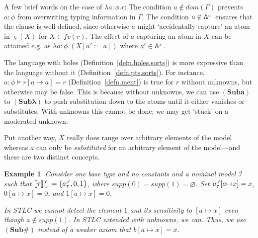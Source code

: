 \documentclass[submission,copyright]{eptcs}
\newtheorem{xmpl}[thrm]{Example}
\newcommand{\f}[1]{\ensuremath{\text{$\mathit{#1}$}}}
\newcommand{\lam}[1]{\lambda{#1}.}
\newcommand{\rulefont}[1]{\ensuremath{(\mathbf{#1})}}
\newcommand{\sm}{\mapsto}
\newcommand{\ssm}{:=}
\newcommand{\dom}{\f{dom}}
\newcommand{\supp}{\f{supp}}
\newcommand{\fv}{\f{fv}}
\newcommand\den[1]{{\hspace{.00ex}\scalebox{.55}{$#1$}}}
\newcommand{\idenot}[2]{\denot{\interp I}{#1}{#2}}
\newcommand\interp[1]{\ensuremath{\mathscr #1}}
\newcommand{\denot}[3]{\llbracket #3 \rrbracket_{\scalebox{.6}{$#2$}}^\den{#1}} \newcommand{\hdenot}[1]{\denot{\interp H}{}{#1}}
\newcommand\ment{\vDash}
\newcommand\atomsdown{\mathbb A^{\hspace{-.3ex}{}_{{}^<}}}
\begin{document}
\noindent A few brief words on the case of $\lam{a{:}\phi}r$:
The condition $a\not\in\dom(\Gamma)$ prevents $a{:}\phi$ from overwriting typing information in $\Gamma$.
The condition $a\not\in\atomsdown$ ensures that the clause is well-defined, since otherwise $a$ might `accidentally capture' an atom in $\varsigma(X)$ for $X\in\fv(r)$.
The effect of $a$ capturing an atom in $X$ can be attained e.g. as $\lam{a{:}\phi}(X[a'{\ssm} a])$ where $a'\in\atomsdown$.


The language with holes (Definition~\ref{defn.holes.sorts}) is more expressive than the language without it (Definition~\ref{defn.pts.sorts}).
For instance, $a{:}\phi\ment r[a{\sm}a]=r$ (Definition~\ref{defn.ment}) is true for $r$ without unknowns, but otherwise may be false.
This is because without unknowns, we can use \rulefont{Suba} to \rulefont{Sub{\text{$\lambda$}}} to push substitution down to the atoms until it either vanishes or substitutes.
With unknowns this cannot be done; we may get `stuck' on a moderated unknown.

Put another way, $X$ really does range over arbitrary elements of the model whereas $a$ can only be \emph{substituted} for an arbitrary element of the model---and these are two distinct concepts.

\begin{xmpl}
\label{xmpl.hole.power}
Consider one base type and no constants and a nominal model $\interp I$ such that $\idenot{a{:}\tau}{\tau}=\{a^\iden_\tau,0,1\}$, where $\supp(0)=\supp(1)=\varnothing$.
Set $a^\iden_\tau[a{\sm} x]=x$, $0[a{\sm} x]=0$, and $1[a{\sm} x]=0$.

In STLC we cannot detect the element $1$ and its sensitivity to $[a{\sm} x]$ even though $a\not\in\supp(1)$.
In STLC extended with unknowns, we can.
Thus, we use \rulefont{Sub\#} instead of a weaker axiom that $b[a{\sm}x]=x$.
\end{xmpl} 
\end{document}
